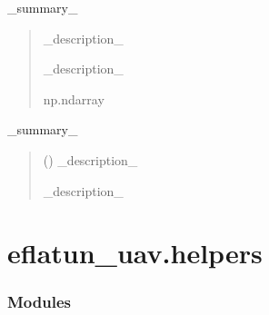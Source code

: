 \documentclass[letterpaper,10pt,english]{sphinxmanual}
\begin{document}
\begin{fulllineitems}
\begin{fulllineitems}
\label{\detokenize{generated/eflatun_uav.filters:eflatun_uav.filters.BaseFilter.predict}}
\pysigstartsignatures
{}
\pysigstopsignatures
\sphinxAtStartPar
\_summary\_
\begin{quote}\begin{description}
\sphinxAtStartPar
{} \textendash{} \_description\_

\sphinxAtStartPar
\_description\_

\sphinxAtStartPar
np.ndarray

\end{description}\end{quote}

\end{fulllineitems}


\begin{fulllineitems}
\label{\detokenize{generated/eflatun_uav.filters:eflatun_uav.filters.BaseFilter.update}}
\pysigstartsignatures
{}
\pysigstopsignatures
\sphinxAtStartPar
\_summary\_
\begin{quote}\begin{description}
\sphinxAtStartPar
{} () \textendash{} \_description\_

\sphinxAtStartPar
{} \textendash{} \_description\_

\end{description}\end{quote}

\end{fulllineitems}


\end{fulllineitems}


\sphinxstepscope


\section{eflatun\_uav.helpers}
\label{\detokenize{generated/eflatun_uav.helpers:module-eflatun_uav.helpers}}\label{\detokenize{generated/eflatun_uav.helpers:eflatun-uav-helpers}}\label{\detokenize{generated/eflatun_uav.helpers::doc}}\subsubsection*{Modules}
\end{document}
